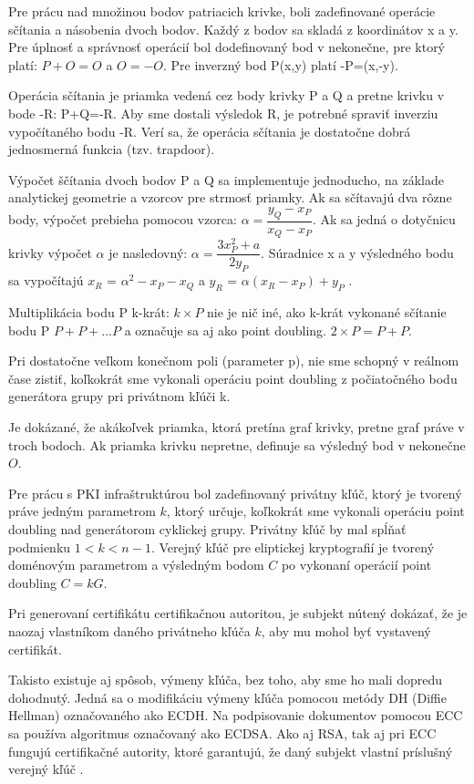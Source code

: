\documentclass[12pt,a4paper,oneside,openright]{report}
\begin{document}
Pre prácu nad množinou bodov patriacich krivke, boli zadefinované operácie sčítania a násobenia dvoch bodov. Každý z bodov sa skladá z  koordinátov x a y. Pre úplnosť a správnosť operácií bol dodefinovaný bod v nekonečne, pre ktorý platí: $P+O=O$ a $O=-O$.
Pre inverzný bod P(x,y) platí -P=(x,-y).

Operácia sčítania je priamka vedená cez body krivky P a Q a  pretne krivku v bode -R: P+Q=-R. Aby sme dostali výsledok R, je potrebné spraviť inverziu vypočítaného bodu -R. Verí sa, že operácia sčítania je dostatočne dobrá jednosmerná funkcia (tzv. trapdoor).

Výpočet ščítania dvoch bodov P a Q sa implementuje jednoducho, na základe analytickej geometrie a vzorcov pre strmosť priamky.
Ak sa sčítavajú dva rôzne body, výpočet prebieha pomocou vzorca: $\alpha = \dfrac{ y_{Q}-x_{P}}{x_{Q}-x_{P}}$. Ak sa jedná o dotyčnicu krivky výpočet $\alpha$ je nasledovný: $\alpha = \dfrac{3x_{P}^2 + a}{2y_{P}}$. Súradnice x a y výsledného bodu sa vypočítajú
$x_{R}$ = $\alpha ^2 - x_{P} - x_{Q}$ a 
$y_{R}$ = $\alpha (x_{R} - x_{P}) + y_{P}$ \cite{ecclesson}.

Multiplikácia bodu P k-krát: $k\times P$ nie je nič iné, ako k-krát vykonané sčítanie bodu P $P+P+...P$ a označuje sa aj ako point doubling. $2\times P = P+P$\cite{ecclesson}.

Pri dostatočne veľkom konečnom poli (parameter p), nie sme schopný v reálnom čase zistiť, koľkokrát sme vykonali operáciu point doubling z počiatočného bodu generátora grupy pri privátnom kľúči k.

Je dokázané, že akákoľvek priamka, ktorá pretína graf krivky, pretne graf práve v troch bodoch. Ak priamka krivku nepretne, definuje sa výsledný bod v nekonečne $O$.

Pre prácu s PKI infraštruktúrou bol zadefinovaný privátny kľúč, ktorý je tvorený práve jedným parametrom $k$, ktorý určuje, koľkokrát sme vykonali operáciu point doubling nad generátorom cyklickej grupy. Privátny kľúč by mal spĺňať podmienku $1<k<n-1$. Verejný kľúč pre eliptickej kryptografií je tvorený doménovým parametrom a výsledným bodom $C$ po vykonaní operácií point doubling $C=kG$.

Pri generovaní certifikátu certifikačnou autoritou, je subjekt nútený dokázať, že je naozaj vlastníkom daného privátneho kľúča $k$, aby mu mohol byť vystavený certifikát\cite{ecclesson}.

Takisto existuje aj spôsob, výmeny kľúča, bez toho, aby sme ho mali dopredu dohodnutý. Jedná sa o modifikáciu výmeny kľúča pomocou metódy DH (Diffie Hellman) označovaného ako ECDH. Na podpisovanie dokumentov pomocou ECC sa používa algoritmus označovaný ako ECDSA. Ako aj RSA, tak aj pri ECC fungujú certifikačné autority, ktoré garantujú, že daný subjekt vlastní príslušný verejný kľúč \cite{ecclesson}.
\end{document}
